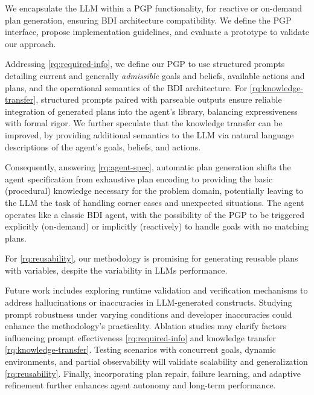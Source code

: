 %
We encapsulate the \ac{LLM} within a \ac{PGP} functionality,
for reactive or on-demand plan generation,
ensuring \ac{BDI} architecture compatibility.
%
We define the \ac{PGP} interface, propose implementation guidelines,
and evaluate a prototype to validate our approach.

Addressing \ref{rq:required-info},
we define our \ac{PGP} to use structured prompts detailing current and generally \emph{admissible} goals and beliefs,
available actions and plans,
and the operational semantics of the \ac{BDI} architecture.
%
%
For \ref{rq:knowledge-transfer},
structured prompts paired with parseable outputs ensure reliable integration of generated plans into the agent’s library,
balancing expressiveness with formal rigor.
%
We further speculate that the knowledge transfer can be improved,
by providing additional semantics to the \ac{LLM}
via natural language descriptions of the agent's goals, beliefs, and actions.

Consequently, answering \ref{rq:agent-spec},
automatic plan generation shifts the agent specification from exhaustive plan encoding
to providing the basic (procedural) knowledge necessary for the problem domain,
potentially leaving to the \ac{LLM} the task of handling
corner cases and unexpected situations.
%
The agent operates like a classic \ac{BDI} agent,
with the possibility of the \ac{PGP} to be triggered explicitly (on-demand) or implicitly (reactively)
to handle goals with no matching plans.

For \ref{rq:reusability},
our methodology is promising for generating reusable plans with variables,
despite the variability in \acp{LLM} performance.


Future work includes exploring runtime validation and verification mechanisms
to address hallucinations or inaccuracies in \ac{LLM}-generated constructs.
%
Studying prompt robustness under varying conditions and developer inaccuracies
could enhance the methodology's practicality.
%
Ablation studies may clarify factors influencing prompt effectiveness \ref{rq:required-info}
and knowledge transfer \ref{rq:knowledge-transfer}.
%
Testing scenarios with concurrent goals, dynamic environments, and partial observability
will validate scalability and generalization \ref{rq:reusability}.
%
Finally, incorporating plan repair, failure learning, and adaptive refinement further enhances agent autonomy and long-term performance.

